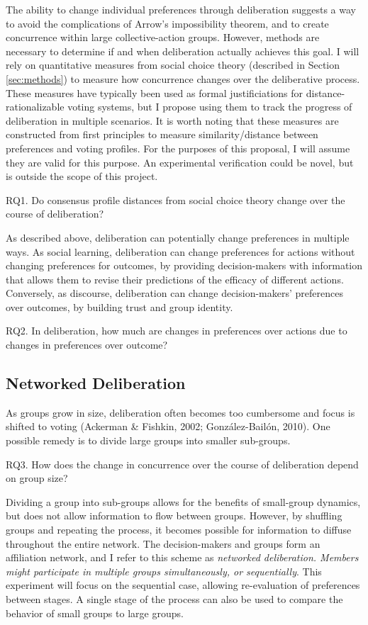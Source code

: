 The ability to change individual preferences through deliberation suggests a way to avoid the complications of Arrow’s impossibility theorem, and to create concurrence within large collective-action groups. However, methods are necessary to determine if and when deliberation actually achieves this goal. I will rely on quantitative measures from social choice theory (described in Section \ref{sec:methods}) to measure how concurrence changes over the deliberative process. These measures have typically been used as formal justificiations for distance-rationalizable voting systems, but I propose using them to track the progress of deliberation in multiple scenarios. It is worth noting that these measures are constructed from first principles to measure similarity/distance between preferences and voting profiles. For the purposes of this proposal, I will assume they are valid for this purpose. An experimental verification could be novel, but is outside the scope of this project.

RQ1. Do consensus profile distances from social choice theory change over the course of deliberation?

As described above, deliberation can potentially change preferences in multiple ways. As social learning, deliberation can change preferences for actions without changing preferences for outcomes, by providing decision-makers with information that allows them to revise their predictions of the efficacy of different actions. Conversely, as discourse, deliberation can change decision-makers’ preferences over outcomes, by building trust and group identity.

RQ2. In deliberation, how much are changes in preferences over actions due to changes in preferences over outcome?

\subsection{Networked Deliberation}
As groups grow in size, deliberation often becomes too cumbersome and focus is shifted to voting (Ackerman \& Fishkin, 2002; Gonz\'alez-Bail\'on, 2010). One possible remedy is to divide large groups into smaller sub-groups.

RQ3. How does the change in concurrence over the course of deliberation depend on group size?

Dividing a group into sub-groups allows for the benefits of small-group dynamics, but does not allow information to flow between groups. However, by shuffling groups and repeating the process, it becomes possible for information to diffuse throughout the entire network. The decision-makers and groups form an affiliation network, and I refer to this scheme as {\em networked deliberation. Members might participate in multiple groups simultaneously, or sequentially}. This experiment will focus on the sequential case, allowing re-evaluation of preferences between stages. A single stage of the process can also be used to compare the behavior of small groups to large groups.

